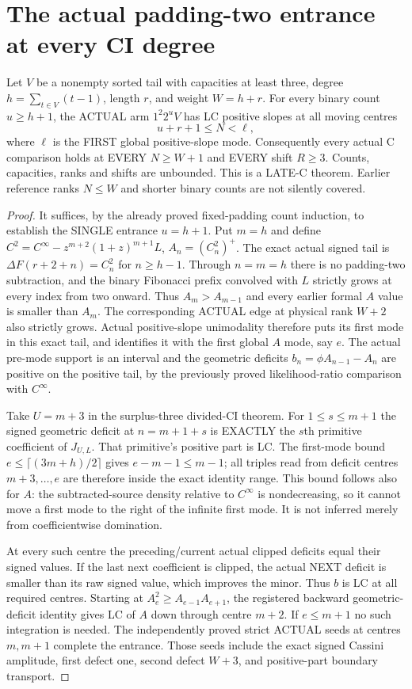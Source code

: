 \section{The actual padding-two entrance at every CI degree}
Let $V$ be a nonempty sorted tail with capacities at least three,
degree $h=\sum_{t\in V}(t-1)$, length $r$, and weight $W=h+r$.
For every binary count $u\ge h+1$, the ACTUAL arm
$1^2 2^u V$ has LC positive slopes at all moving centres
\[
                 u+r+1\le N<\ell,
\]
where $\ell$ is the FIRST global positive-slope mode. Consequently
every actual C comparison holds at EVERY $N\ge W+1$ and EVERY
shift $R\ge3$. Counts, capacities, ranks and shifts are unbounded.
This is a LATE-C theorem. Earlier reference ranks $N\le W$ and
shorter binary counts are not silently covered.

\begin{proof}
It suffices, by the already proved fixed-padding count induction,
to establish the SINGLE entrance $u=h+1$. Put $m=h$ and define
$C^2=C^\infty-z^{m+2}(1+z)^{m+1}L$, $A_n=(C^2_n)^+$.
The exact actual signed tail is $\Delta F(r+2+n)=C^2_n$ for
$n\ge h-1$. Through $n=m=h$ there is no padding-two subtraction,
and the binary Fibonacci prefix convolved with $L$ strictly grows
at every index from two onward. Thus $A_m>A_{m-1}$ and every
earlier formal $A$ value is smaller than $A_m$. The corresponding
ACTUAL edge at physical rank $W+2$ also strictly grows. Actual
positive-slope unimodality therefore puts its first mode in this
exact tail, and identifies it with the first global $A$ mode,
say $e$. The actual pre-mode support is an
interval and the geometric deficits $b_n=\phi A_{n-1}-A_n$
are positive on the positive tail, by the previously proved
likelihood-ratio comparison with $C^\infty$.

Take $U=m+3$ in the surplus-three divided-CI theorem. For
$1\le s\le m+1$ the signed geometric deficit at $n=m+1+s$
is EXACTLY the $s$th primitive coefficient of $J_{U,L}$.
That primitive's positive part is LC. The first-mode bound
$e\le\lceil(3m+h)/2\rceil$ gives $e-m-1\le m-1$;
all triples read from deficit centres $m+3,\ldots,e$ are
therefore inside the exact identity range. This bound follows
also for $A$: the subtracted-source density relative to
$C^\infty$ is nondecreasing, so it cannot move a first mode
to the right of the infinite first mode. It is not inferred
merely from coefficientwise domination.

At every such centre the preceding/current actual clipped
deficits equal their signed values. If the last next coefficient
is clipped, the actual NEXT deficit is smaller than its raw signed
value, which improves the minor. Thus $b$ is LC at all required
centres. Starting at $A_e^2\ge A_{e-1}A_{e+1}$, the registered
backward geometric-deficit identity gives LC of $A$ down through
centre $m+2$. If $e\le m+1$ no such integration is needed.
The independently proved strict ACTUAL seeds at centres $m,m+1$
complete the entrance. Those seeds include the exact signed
Cassini amplitude, first defect one, second defect $W+3$, and
positive-part boundary transport.


\end{proof}
